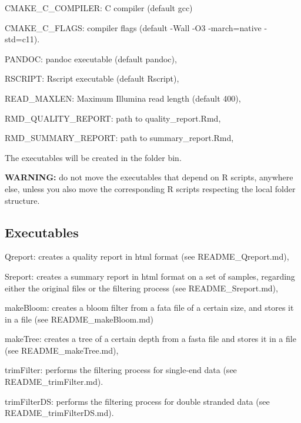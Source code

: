 \begin{DoxyItemize}
\item {\ttfamily C\+M\+A\+K\+E\+\_\+\+C\+\_\+\+C\+O\+M\+P\+I\+L\+ER}\+: {\ttfamily C} compiler (default {\ttfamily gcc})
\item {\ttfamily C\+M\+A\+K\+E\+\_\+\+C\+\_\+\+F\+L\+A\+GS}\+: compiler flags (default {\ttfamily -\/\+Wall -\/\+O3 -\/march=native -\/std=c11}).
\item {\ttfamily P\+A\+N\+D\+OC}\+: {\ttfamily pandoc} executable (default {\ttfamily pandoc}),
\item {\ttfamily R\+S\+C\+R\+I\+PT}\+: {\ttfamily Rscript} executable (default {\ttfamily Rscript}),
\item {\ttfamily R\+E\+A\+D\+\_\+\+M\+A\+X\+L\+EN}\+: Maximum Illumina read length (default 400),
\item {\ttfamily R\+M\+D\+\_\+\+Q\+U\+A\+L\+I\+T\+Y\+\_\+\+R\+E\+P\+O\+RT}\+: path to {\ttfamily quality\+\_\+report.\+Rmd},
\item {\ttfamily R\+M\+D\+\_\+\+S\+U\+M\+M\+A\+R\+Y\+\_\+\+R\+E\+P\+O\+RT}\+: path to {\ttfamily summary\+\_\+report.\+Rmd},
\end{DoxyItemize}

The executables will be created in the folder {\ttfamily bin}.

{\bfseries W\+A\+R\+N\+I\+NG\+:} do not move the executables that depend on {\ttfamily R} scripts, anywhere else, unless you also move the corresponding {\ttfamily R} scripts respecting the local folder structure.

\subsection*{Executables}


\begin{DoxyItemize}
\item {\ttfamily Qreport}\+: creates a quality report in html format (see {\ttfamily R\+E\+A\+D\+M\+E\+\_\+\+Qreport.\+md}),
\item {\ttfamily Sreport}\+: creates a summary report in html format on a set of samples, regarding either the original files or the filtering process (see {\ttfamily R\+E\+A\+D\+M\+E\+\_\+\+Sreport.\+md}),
\item {\ttfamily make\+Bloom}\+: creates a bloom filter from a fata file of a certain size, and stores it in a file (see {\ttfamily R\+E\+A\+D\+M\+E\+\_\+make\+Bloom.\+md})
\item {\ttfamily make\+Tree}\+: creates a tree of a certain depth from a fasta file and stores it in a file (see {\ttfamily R\+E\+A\+D\+M\+E\+\_\+make\+Tree.\+md}),
\item {\ttfamily trim\+Filter}\+: performs the filtering process for single-\/end data (see {\ttfamily R\+E\+A\+D\+M\+E\+\_\+trim\+Filter.\+md}).
\item {\ttfamily trim\+Filter\+DS}\+: performs the filtering process for double stranded data (see {\ttfamily R\+E\+A\+D\+M\+E\+\_\+trim\+Filter\+D\+S.\+md}).
\end{DoxyItemize}

